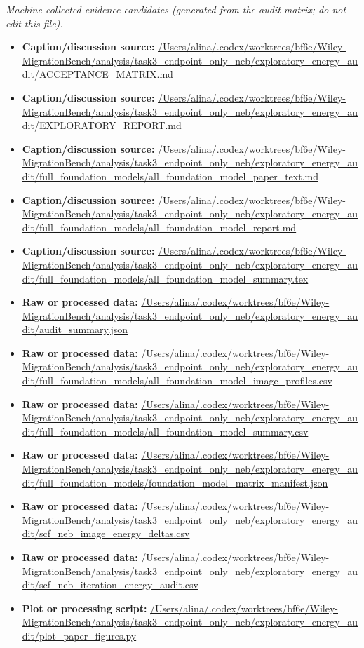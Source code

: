 \emph{Machine-collected evidence candidates (generated from the audit matrix; do not edit this file).}
\begin{itemize}[leftmargin=1.4em,noitemsep]
\item \textbf{Caption/discussion source:} \url{/Users/alina/.codex/worktrees/bf6e/Wiley-MigrationBench/analysis/task3_endpoint_only_neb/exploratory_energy_audit/ACCEPTANCE_MATRIX.md}
\item \textbf{Caption/discussion source:} \url{/Users/alina/.codex/worktrees/bf6e/Wiley-MigrationBench/analysis/task3_endpoint_only_neb/exploratory_energy_audit/EXPLORATORY_REPORT.md}
\item \textbf{Caption/discussion source:} \url{/Users/alina/.codex/worktrees/bf6e/Wiley-MigrationBench/analysis/task3_endpoint_only_neb/exploratory_energy_audit/full_foundation_models/all_foundation_model_paper_text.md}
\item \textbf{Caption/discussion source:} \url{/Users/alina/.codex/worktrees/bf6e/Wiley-MigrationBench/analysis/task3_endpoint_only_neb/exploratory_energy_audit/full_foundation_models/all_foundation_model_report.md}
\item \textbf{Caption/discussion source:} \url{/Users/alina/.codex/worktrees/bf6e/Wiley-MigrationBench/analysis/task3_endpoint_only_neb/exploratory_energy_audit/full_foundation_models/all_foundation_model_summary.tex}
\item \textbf{Raw or processed data:} \url{/Users/alina/.codex/worktrees/bf6e/Wiley-MigrationBench/analysis/task3_endpoint_only_neb/exploratory_energy_audit/audit_summary.json}
\item \textbf{Raw or processed data:} \url{/Users/alina/.codex/worktrees/bf6e/Wiley-MigrationBench/analysis/task3_endpoint_only_neb/exploratory_energy_audit/full_foundation_models/all_foundation_model_image_profiles.csv}
\item \textbf{Raw or processed data:} \url{/Users/alina/.codex/worktrees/bf6e/Wiley-MigrationBench/analysis/task3_endpoint_only_neb/exploratory_energy_audit/full_foundation_models/all_foundation_model_summary.csv}
\item \textbf{Raw or processed data:} \url{/Users/alina/.codex/worktrees/bf6e/Wiley-MigrationBench/analysis/task3_endpoint_only_neb/exploratory_energy_audit/full_foundation_models/foundation_model_matrix_manifest.json}
\item \textbf{Raw or processed data:} \url{/Users/alina/.codex/worktrees/bf6e/Wiley-MigrationBench/analysis/task3_endpoint_only_neb/exploratory_energy_audit/scf_neb_image_energy_deltas.csv}
\item \textbf{Raw or processed data:} \url{/Users/alina/.codex/worktrees/bf6e/Wiley-MigrationBench/analysis/task3_endpoint_only_neb/exploratory_energy_audit/scf_neb_iteration_energy_audit.csv}
\item \textbf{Plot or processing script:} \url{/Users/alina/.codex/worktrees/bf6e/Wiley-MigrationBench/analysis/task3_endpoint_only_neb/exploratory_energy_audit/plot_paper_figures.py}
\end{itemize}
